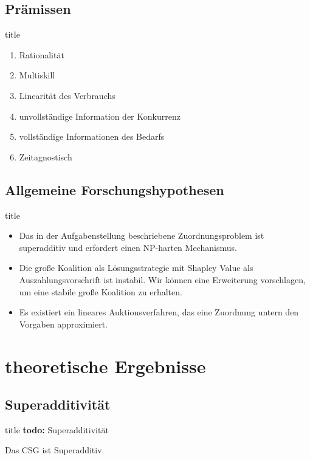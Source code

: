 \documentclass[c]{beamer}
\newcommand\todo[1]{\colorbox{blue!15}{\textbf{todo: }#1}\newline}
\theoremstyle{break}
\begin{document}
  \subsection*{Prämissen} 
  \begin{frame}{title} %
    \begin{enumerate}
      \item Rationalität
      \item Multiskill
      \item Linearität des Verbrauchs
      \item unvollständige Information der Konkurrenz
      \item vollständige Informationen des Bedarfs
      \item Zeitagnostisch
    \end{enumerate}
  \end{frame}
  
  
  \subsection*{Allgemeine Forschungshypothesen}
  \begin{frame}{title} %
    \begin{itemize}
      \item Das in der Aufgabenstellung beschriebene Zuordnungsproblem ist superadditiv  und erfordert einen NP-harten Mechanismus.
      \item Die große Koalition als Lösungsstrategie mit Shapley Value als  Auszahlungsvorschrift ist instabil. Wir können eine Erweiterung vorschlagen, um eine stabile große Koalition zu erhalten.
      \item Es existiert ein lineares Auktionsverfahren, das eine Zuordnung untern den Vorgaben approximiert.
    \end{itemize}
  \end{frame}


  \section*{theoretische Ergebnisse}
  \subsection*{Superadditivität}
  \begin{frame}{title} %
    \todo{Superadditivität}
    \begin{lemma}
      Das CSG ist Superadditiv.
    \end{lemma}
  \end{frame}
  
\end{document}
